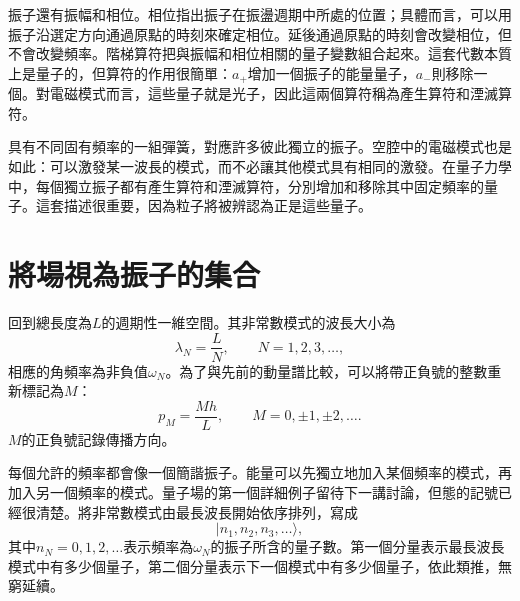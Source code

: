 振子還有振幅和相位。相位指出振子在振盪週期中所處的位置；具體而言，可以用振子沿選定方向通過原點的時刻來確定相位。延後通過原點的時刻會改變相位，但不會改變頻率。階梯算符把與振幅和相位相關的量子變數組合起來。這套代數本質上是量子的，但算符的作用很簡單：\(a_+\)增加一個振子的能量量子，\(a_-\)則移除一個。對電磁模式而言，這些量子就是光子，因此這兩個算符稱為產生算符和湮滅算符。

\begin{classroomqa}
\end{classroomqa}

具有不同固有頻率的一組彈簧，對應許多彼此獨立的振子。空腔中的電磁模式也是如此：可以激發某一波長的模式，而不必讓其他模式具有相同的激發。在量子力學中，每個獨立振子都有產生算符和湮滅算符，分別增加和移除其中固定頻率的量子。這套描述很重要，因為粒子將被辨認為正是這些量子。

\section{將場視為振子的集合}

回到總長度為\(L\)的週期性一維空間。其非常數模式的波長大小為
\begin{equation}
\lambda_N=\frac{L}{N},
\qquad N=1,2,3,\ldots ,
\end{equation}
相應的角頻率為非負值\(\omega_N\)。為了與先前的動量譜比較，可以將帶正負號的整數重新標記為\(M\)：
\begin{equation}
p_M=\frac{Mh}{L},
\qquad M=0,\pm1,\pm2,\ldots .
\end{equation}
\(M\)的正負號記錄傳播方向。

每個允許的頻率都會像一個簡諧振子。能量可以先獨立地加入某個頻率的模式，再加入另一個頻率的模式。量子場的第一個詳細例子留待下一講討論，但態的記號已經很清楚。將非常數模式由最長波長開始依序排列，寫成
\begin{equation}
|n_1,n_2,n_3,\ldots\rangle,
\end{equation}
其中\(n_N=0,1,2,\ldots\)表示頻率為\(\omega_N\)的振子所含的量子數。第一個分量表示最長波長模式中有多少個量子，第二個分量表示下一個模式中有多少個量子，依此類推，無窮延續。

